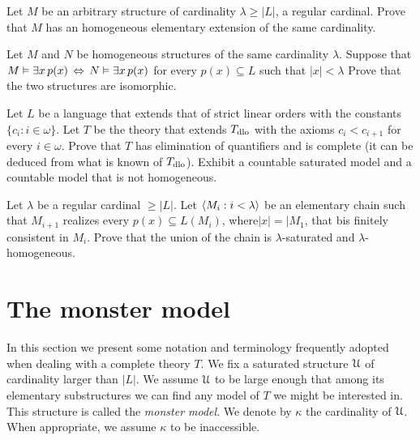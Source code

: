 \begin{exercise}\label{ex_omega_homogeneous_same_card}
Let $M$ be an arbitrary structure of cardinality $\lambda\ge|L|$, a regular cardinal.
Prove that $M$ has an homogeneous elementary extension of the same cardinality. 
\end{exercise}

\begin{exercise}
  Let $M$ and $N$ be homogeneous structures of the same cardinality $\lambda$.
  Suppose that $M\vDash\exists x\, p(x)\,\Leftrightarrow\,N\vDash\exists x\, p(x)$ for every $p(x)\subseteq L$ such that $|x|<\lambda$
  Prove that the two structures are isomorphic. 
\end{exercise}

\begin{exercise}\label{vaughtesempio}
  Let $L$ be a language that extends that of strict linear orders with the constants $\{c_i: i\in\omega\}$.
  Let $T$ be the theory that extends $T_{\rm dlo}$ with the axioms $c_i<c_{i+1}$ for every  $i\in\omega$. Prove that $T$ has elimination of quantifiers and is complete (it can be deduced from what is known of $T_{\rm dlo}$). 
  Exhibit a countable saturated model and a countable model that is not homogeneous. 
\end{exercise}

\begin{exercise}
  Let $\lambda$ be a regular cardinal $\ge|L|$.
  Let $\langle M_i:i<\lambda\rangle$ be an elementary chain such that $M_{i+1}$ realizes every $p(x)\subseteq L(M_i)$, where$|x|=|M_1$, that bis finitely consistent in $M_i$.
  Prove that the union of the chain is $\lambda$-saturated and $\lambda$-homogeneous.
\end{exercise}

\section{The monster model}\label{monster}
\label{compattezzasaturazione}

In this section we present some notation and terminology frequently adopted when dealing with a complete theory $T$.
We fix a saturated structure $\EuScript U$ of cardinality larger than $|L|$.
We assume $\EuScript U$ to be large enough that among its elementary substructures we can find any model of $T$ we might be interested in.
This structure is called the \emph{monster model}.
We denote by $\kappa$ the cardinality of $\EuScript U$.
When appropriate, we assume $\kappa$ to be inaccessible. 

